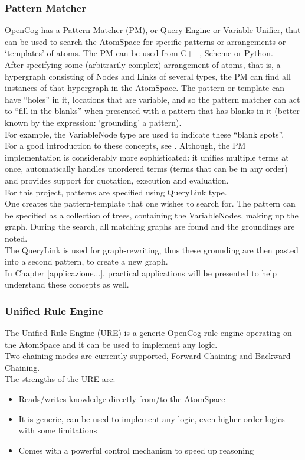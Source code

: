 \subsubsection{Pattern Matcher}\label{sec:pattern_matcher}

OpenCog has a Pattern Matcher (PM), or Query Engine or Variable Unifier, that can be used to search the AtomSpace for specific patterns or arrangements or `templates' of atoms. 
The PM can be used from C++, Scheme or Python. \\
After specifying some (arbitrarily complex) arrangement of atoms, that is, a hypergraph consisting of Nodes and Links of several types, the PM can find all instances of that hypergraph in the AtomSpace. The pattern or template can have \enquote{holes} in it, locations that are variable, and so the pattern matcher can act to \enquote{fill in the blanks} when presented with a pattern that has blanks in it (better known by the expression: `grounding' a pattern). \\
For example, the VariableNode type are used to indicate these \enquote{blank spots}. \\
For a good introduction to these concepts, see \cite{baader_nipkow_1998}. Although, the PM implementation is considerably more sophisticated: it unifies multiple terms at once, automatically handles unordered terms (terms that can be in any order) and provides support for quotation, execution and evaluation. \\

For this project, patterns are specified using QueryLink type. \\
One creates the pattern-template that one wishes to search for. The pattern can be specified as a collection of trees, containing the VariableNodes, making up the graph. 
During the search, all matching graphs are found and the groundings are noted. \\
The QueryLink is used for graph-rewriting, thus these grounding are then pasted into a second pattern, to create a new graph. \\
In Chapter [applicazione...], practical applications will be presented to help understand these concepts as well.

\subsubsection{Unified Rule Engine}\label{sec:ure}

The Unified Rule Engine (URE) is a generic OpenCog rule engine operating on the AtomSpace and it can be used to implement any logic. \\
Two chaining modes are currently supported, Forward Chaining and Backward Chaining. \\
The strengths of the URE are:
\begin{itemize}
	\item Reads/writes knowledge directly from/to the AtomSpace
	\item It is generic, can be used to implement any logic, even higher order logics with some limitations
	\item Comes with a powerful control mechanism to speed up reasoning
\end{itemize}

